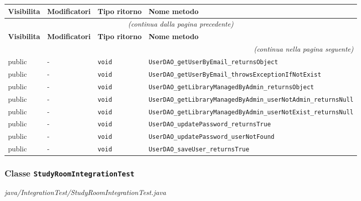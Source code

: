 \begin{longtable}{@{}llll@{}}
\toprule
\textbf{Visibilita} & \textbf{Modificatori} & \textbf{Tipo ritorno} & \textbf{Nome metodo} \\
\midrule
\endfirsthead
\multicolumn{4}{c}{\small\itshape (continua dalla pagina precedente)} \\
\toprule
\textbf{Visibilita} & \textbf{Modificatori} & \textbf{Tipo ritorno} & \textbf{Nome metodo} \\
\midrule
\endhead
\midrule
\multicolumn{4}{r}{\small\itshape (continua nella pagina seguente)} \\
\endfoot
\bottomrule
\endlastfoot
  public & - & \texttt{void} & \texttt{UserDAO\_getUserByEmail\_returnsObject} \\
  public & - & \texttt{void} & \texttt{UserDAO\_getUserByEmail\_throwsExceptionIfNotExist} \\
  public & - & \texttt{void} & \texttt{UserDAO\_getLibraryManagedByAdmin\_returnsObject} \\
  public & - & \texttt{void} & \texttt{UserDAO\_getLibraryManagedByAdmin\_userNotAdmin\_returnsNull} \\
  public & - & \texttt{void} & \texttt{UserDAO\_getLibraryManagedByAdmin\_userNotExist\_returnsNull} \\
  public & - & \texttt{void} & \texttt{UserDAO\_updatePassword\_returnsTrue} \\
  public & - & \texttt{void} & \texttt{UserDAO\_updatePassword\_userNotFound} \\
  public & - & \texttt{void} & \texttt{UserDAO\_saveUser\_returnsTrue} \\
\end{longtable}

\subsubsection*{Classe \texttt{StudyRoomIntegrationTest}}\label{StudyRoomIntegrationTest}
{\small\textit{java/IntegrationTest/StudyRoomIntegrationTest.java}}
\vspace{4pt}

